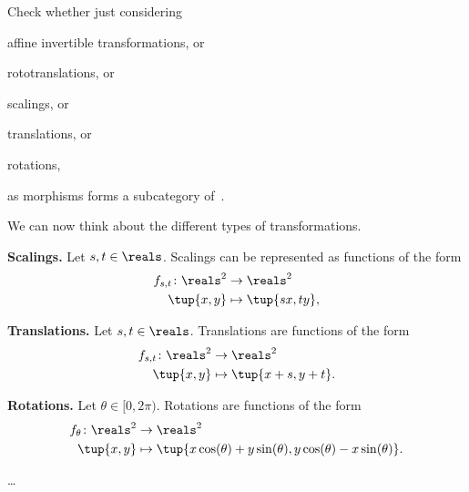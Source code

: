 \begin{exercise}
    \label{ex:draw}
    Check whether just considering
    \begin{compactitem}
        \item affine invertible transformations, or
        \item rototranslations, or
        \item scalings, or
        \item translations, or
        \item rotations,
    \end{compactitem}
    as morphisms forms a subcategory of~\Draw.
\end{exercise}
\begin{solution}
    We can now think about the different types of transformations.
    \begin{compactitem}
        \item \textbf{Scalings.} Let $s,t\in \reals$.
              Scalings can be represented as functions of the form
              \begin{equation*}
                  \begin{aligned}
                      f_{s,t}\colon \reals^2 & \to \reals^2           \\
                      \tup{x,y}              & \mapsto \tup{s x,t y},
                  \end{aligned}
              \end{equation*}
        \item \textbf{Translations.}  Let $s,t\in \reals$.
              Translations are functions of the form
              \begin{equation*}
                  \begin{aligned}
                      f_{s,t}\colon \reals^2 & \to \reals^2           \\
                      \tup{x,y}              & \mapsto \tup{x+s,y+t}.
                  \end{aligned}
              \end{equation*}
        \item \textbf{Rotations.} Let $\theta \in [0,2\pi)$.
              Rotations are functions of the form
              \begin{equation*}
                  \begin{aligned}
                      f_{\theta}\colon \reals^2 & \to \reals^2                                                            \\
                      \tup{x,y}                 & \mapsto \tup{x\cos(\theta)+y\sin(\theta), y\cos(\theta)-x\sin(\theta)}.
                  \end{aligned}
              \end{equation*}
        \item \dots

    \end{compactitem}
\end{solution}


